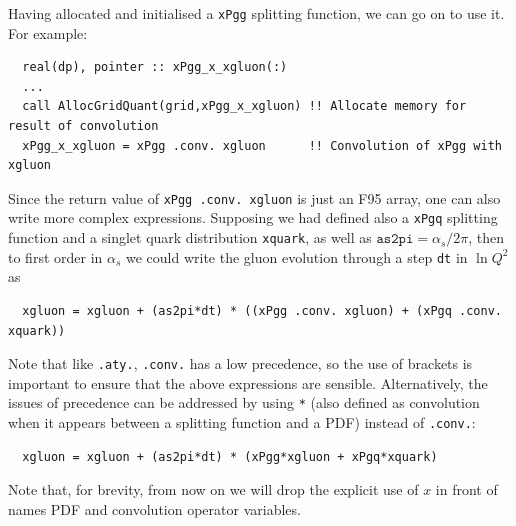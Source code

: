 \documentclass[12pt]{article}
\newcommand{\as}{\alpha_s}
\newcommand{\ttt}[1]{\texttt{#1}}
\begin{document}
Having allocated and initialised a \texttt{xPgg} splitting function, we
can go on to use it. For example: 
\begin{lstlisting}
  real(dp), pointer :: xPgg_x_xgluon(:)
  ...
  call AllocGridQuant(grid,xPgg_x_xgluon) !! Allocate memory for result of convolution
  xPgg_x_xgluon = xPgg .conv. xgluon      !! Convolution of xPgg with xgluon
\end{lstlisting}  
Since the return value of \texttt{xPgg .conv.\ xgluon} is just an F95
array, one can also write more complex expressions. Supposing we had
defined also a \texttt{xPgq} splitting function and a singlet
quark distribution \ttt{xquark}, 
as well as $\texttt{as2pi} = \as/2\pi$,
then to first order in $\as$ we could write the gluon evolution
through a step \texttt{dt} in $\ln Q^2$ as
\begin{lstlisting}
  xgluon = xgluon + (as2pi*dt) * ((xPgg .conv. xgluon) + (xPgq .conv. xquark))
\end{lstlisting}
Note that like \texttt{.aty.}, \texttt{.conv.} has a low precedence,
so the use of brackets is important to ensure that the above
expressions are sensible. Alternatively, the issues of precedence can
be addressed by using \texttt{*} (also defined as convolution when it
appears between a splitting function and a PDF) instead of
\texttt{.conv.}:
\begin{lstlisting}
  xgluon = xgluon + (as2pi*dt) * (xPgg*xgluon + xPgq*xquark)
\end{lstlisting}
Note that, for brevity, from now on we will drop the explicit use of
$x$ in front of names PDF and convolution operator variables.


\end{document}
